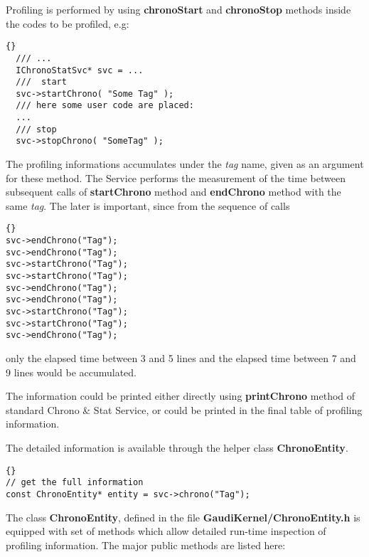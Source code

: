 \documentclass{lhcbnote}
\newcommand{\bftt}         {\ttfamily\bfseries}
\renewcommand{\it}         {\itshape}
\begin{document}
Profiling is performed by using {\bftt{chronoStart}} and
{\bftt{chronoStop}} methods inside the codes to be profiled, e.g:

\begin{lstlisting}{}
  /// ...
  IChronoStatSvc* svc = ...
  ///  start
  svc->startChrono( "Some Tag" );
  /// here some user code are placed:
  ...
  /// stop
  svc->stopChrono( "SomeTag" );
\end{lstlisting}

The profiling informations accumulates
under the {\it{tag}} name, given as an argument for these method.
The Service performs the measurement of the
time between subsequent calls of {\bftt{startChrono}}
 method and {\bftt{endChrono}} method with the same {\it{tag}}.
The later is important, since from the sequence of calls

\begin{lstlisting}{}
svc->endChrono("Tag");
svc->endChrono("Tag");
svc->startChrono("Tag");
svc->startChrono("Tag");
svc->endChrono("Tag");
svc->endChrono("Tag");
svc->startChrono("Tag");
svc->startChrono("Tag");
svc->endChrono("Tag");
\end{lstlisting}

 only the elapsed time between 3 and 5 lines and the
elapsed time between 7 and 9 lines would be accumulated.

The information could be printed either directly
using {\bftt{printChrono}} method of standard
Chrono \& Stat Service, or could be printed in the
final table of profiling information.

The detailed information is available through
the helper class {\bftt{ChronoEntity}}.

\begin{lstlisting}{}
// get the full information
const ChronoEntity* entity = svc->chrono("Tag");
\end{lstlisting}

The class {\bftt{ChronoEntity}}, defined in the file
{\bftt{GaudiKernel/ChronoEntity.h}} is equipped with set
of methods which allow detailed run-time inspection
of profiling information. The major public methods
are listed here:
\end{document}
